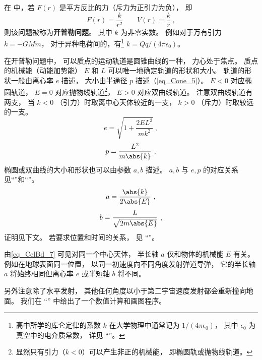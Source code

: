 

在 中，若 $F(r)$ 是平方反比的力（斥力为正引力为负）， 即
\begin{equation}\label{eq_CelBd_1}
F(r) = \frac{k}{r^2}  \qquad V(r) = \frac{k}{r}~,
\end{equation}
则该问题被称为\textbf{开普勒问题}。 其中 $k$ 为非零实数。 例如对于万有引力 $k = -GMm$， 对于异种电荷间的，有\footnote{高中所学的库仑定律的系数 $k$ 在大学物理中通常记为 $1/(4\pi\epsilon_0)$， 其中 $\epsilon_0$ 为真空中的电介质常数， 详见 “”。} $k = Qq/(4\pi\epsilon_0)$。

在开普勒问题中， 可以质点的运动轨道是圆锥曲线的一种， 力心处于焦点。 质点的机械能（动能加势能） $E$ 和 $L$ 可以唯一地确定轨道的形状和大小。 轨道的形状一般由离心率 $e$ 描述， 大小由半通径 $p$ 描述（\autoref{eq_Cone_5}）。 $E < 0$ 对应椭圆轨道， $E = 0$ 对应抛物线轨道\footnote{显然只有引力（$k < 0$）可以产生非正的机械能， 即椭圆轨或抛物线轨道。}， $E > 0$ 对应双曲线轨道。 注意双曲线轨道有两支， 当 $k < 0$ （引力）时取离中心天体较近的一支， $k > 0$ （斥力）时取较远的一支。
\begin{equation}\label{eq_CelBd_2}
e = \sqrt{1 + \frac{2EL^2}{mk^2}}~,
\end{equation}
\begin{equation}\label{eq_CelBd_3}
p = \frac{L^2}{m\abs{k}}~,
\end{equation}
椭圆或双曲线的大小和形状也可以由参数 $a,b$ 描述。 $a,b$ 与 $e,p$ 的对应关系见“”和“”。
\begin{equation}\label{eq_CelBd_7}
a = \frac{\abs{k}}{2\abs{E}}~,
\end{equation}
\begin{equation}\label{eq_CelBd_8}
b = \frac{L}{\sqrt{2m\abs{E}}}~,
\end{equation}
证明见下文。 若要求位置和时间的关系， 见 “”。

\begin{example}{}
由\autoref{eq_CelBd_7} 可见对同一个中心天体， 半长轴 $a$ 仅和物体的机械能 $E$ 有关。 例如在地球表面同一位置， 以同一初速度向不同角度发射弹道导弹， 它的半长轴 $a$ 将始终相同但离心率 $e$ 或半短轴 $b$ 将不同。

另外注意除了水平发射， 其他任何角度以小于第二宇宙速度发射都会重新撞向地面。 我们在 “” 中给出了一个数值计算和画图程序。
\end{example}

